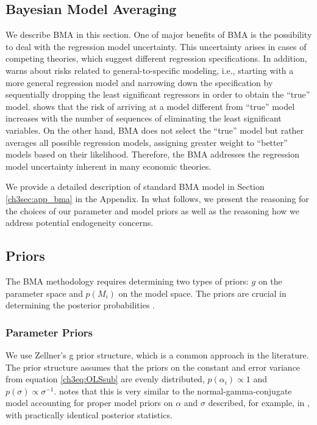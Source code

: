 \begin{refsection}
\section{Bayesian Model Averaging}
\label{ch3sec:BMA}
We describe \ac{BMA} in this section. %
One of major benefits of \ac{BMA} is the possibility to deal with the regression model uncertainty. This uncertainty arises in cases of competing theories, which suggest different regression specifications. In addition, \textcite{Koop2003} warns about risks related to general-to-specific modeling, i.e., starting with a more general regression model and narrowing down the specification by sequentially dropping the least significant regressors in order to obtain the ``true'' model. \textcite{Koop2003} shows that the risk of arriving at a model different from ``true'' model increases with the number of sequences of eliminating the least significant variables. On the other hand, BMA does not select the ``true'' model but rather averages all possible regression models, assigning greater weight to ``better'' models based on their likelihood. Therefore, the \ac{BMA} addresses the regression model uncertainty inherent in many economic theories. 

We provide a detailed description of standard BMA model in Section \ref{ch3sec:app_bma} in the Appendix. In what follows, we present the reasoning for the choices of our parameter and model priors as well as the reasoning how we address potential endogeneity concerns. 

\subsection*{Priors}
\label{ch3sec:priors}
The \ac{BMA} methodology requires determining two types of priors: $g$ on the parameter space and $p(M_{i})$ on the model space. The priors are crucial in determining the posterior probabilities \parencite{FeldkircherZeugner2009,CicconeJarocinski2010,Liangetal2008}.

\subsubsection*{Parameter Priors}
We use Zellner's g prior structure, which is a common approach in the literature. The prior structure assumes that the priors on the constant and error variance from equation \ref{ch3eq:OLSsub} are evenly distributed, $p(\alpha_{i}) \propto 1$ and $p(\sigma) \propto \sigma^{-1}$. \textcite{Zeugner2011} notes that this is very similar to the normal-gamma-conjugate model accounting for proper model priors on $\alpha$ and $\sigma$ described, for example, in \textcite{Koop2003}, with practically identical posterior statistics. 


\end{refsection}
